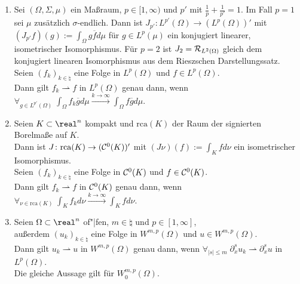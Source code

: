 \linie

\begin{Bsp}
    \begin{enumerate}[label=\emph{(\alph*)}]
        \item
        Sei $(\Omega, \Sigma, \mu)$ ein Maßraum, $p \in [1, \infty)$ und
        $p'$ mit $\frac{1}{p} + \frac{1}{p'} = 1$.
        Im Fall $p = 1$ sei $\mu$ zusätzlich $\sigma$-endlich.
        Dann ist $J_{p'}\colon L^{p'}(\Omega) \rightarrow (L^p(\Omega))'$ mit
        $(J_{p'} f)(g) := \int_\Omega g\overline{f} d\mu$ für $g \in L^p(\mu)$
        ein konjugiert linearer, isometrischer Isomorphismus.
        Für $p = 2$ ist $J_2 = \mathcal{R}_{L^2(\Omega)}$ gleich dem
        konjugiert linearen Isomorphismus aus dem Rieszschen Darstellungssatz.\\
        Seien $(f_k)_{k \in \natural}$ eine Folge in $L^p(\Omega)$ und $f \in L^p(\Omega)$.\\
        Dann gilt $f_k \rightharpoonup f$ in $L^p(\Omega)$ genau dann,
        wenn $\forall_{g \in L^{p'}(\Omega)}\; \int_\Omega f_k \overline{g} d\mu
        \xrightarrow{k \to \infty} \int_\Omega f\overline{g} d\mu$.
        
        \item
        Seien $K \subset \real^n$ kompakt und
        $\text{rca}(K)$ der Raum der signierten Borelmaße auf $K$.\\
        Dann ist $J\colon \text{rca}(K) \rightarrow (\mathcal{C}^0(K))'$ mit
        $(J\nu)(f) := \int_K fd\nu$ ein isometrischer Isomorphismus.\\
        Seien $(f_k)_{k \in \natural}$ eine Folge in $\mathcal{C}^0(K)$ und $f \in \mathcal{C}^0(K)$.\\
        Dann gilt $f_k \rightharpoonup f$ in $\mathcal{C}^0(K)$ genau dann,
        wenn $\forall_{\nu \in \text{rca}(K)}\; \int_K f_k d\nu
        \xrightarrow{k \to \infty} \int_K f d\nu$.
        
        \item
        Seien $\Omega \subset \real^n$ of"|fen, $m \in \natural$ und $p \in [1, \infty]$,\\
        außerdem $(u_k)_{k \in \natural}$ eine
        Folge in $W^{m,p}(\Omega)$ und $u \in W^{m,p}(\Omega)$.\\
        Dann gilt $u_k \rightharpoonup u$ in $W^{m,p}(\Omega)$ genau dann,
        wenn $\forall_{|s| \le m}\; \partial_x^s u_k \rightharpoonup \partial_x^s u$
        in $L^p(\Omega)$.\\
        Die gleiche Aussage gilt für $W^{m,p}_0(\Omega)$.
    \end{enumerate}
\end{Bsp}

